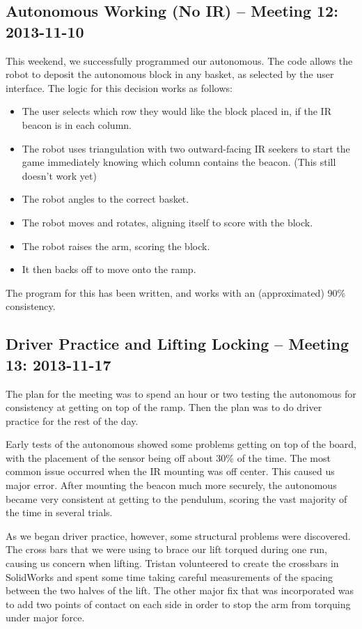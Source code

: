 \newpage \subsection{Autonomous Working (No IR) -- Meeting 12: 2013-11-10}
This weekend, we successfully programmed our autonomous. The code allows the robot to deposit the autonomous block in any basket, as selected by the user interface. The logic for this decision works as follows:
\begin{itemize}
\item The user selects which row they would like the block placed in, if the IR beacon is in each column.
\item The robot uses triangulation with two outward-facing IR seekers to start the game immediately knowing which column contains the beacon. (This still doesn't work yet)
\item The robot angles to the correct basket.
\item The robot moves and rotates, aligning itself to score with the block.
\item The robot raises the arm, scoring the block.
\item It then backs off to move onto the ramp.
\end{itemize}

The program for this has been written, and works with an (approximated) 90\% consistency.

\newpage \subsection{Driver Practice and Lifting Locking -- Meeting 13: 2013-11-17}
The plan for the meeting was to spend an hour or two testing the autonomous for consistency at getting on top of the ramp. Then the plan was to do driver practice for the rest of the day.

Early tests of the autonomous showed some problems getting on top of the board, with the placement of the sensor being off about 30\% of the time. The most common issue occurred when the IR mounting was off center. This caused us major error. After mounting the beacon much more securely, the autonomous became very consistent at getting to the pendulum, scoring the vast majority of the time in several trials.

As we began driver practice, however, some structural problems were discovered. The cross bars that we were using to brace our lift torqued during one run, causing us concern when lifting. Tristan volunteered to create the crossbars in SolidWorks and spent some time taking careful measurements of the spacing between the two halves of the lift. The other major fix that was incorporated was to add two points of contact on each side in order to stop the arm from torquing under major force.

